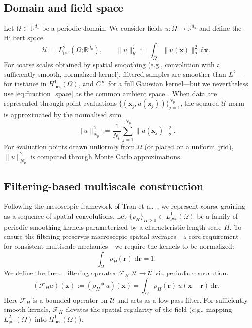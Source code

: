 \documentclass[review,onefignum,onetabnum]{siamart250211}
\newcommand{\R}{\mathbb{R}}
\newcommand{\dd}{\,\mathrm{d}}
\newcommand{\1}{\mathbf{1}}
\newcommand{\cU}{\mathcal{U}}
\newcommand{\cF}{\mathcal{F}}
\begin{document}
\subsection{Domain and field space}
Let $\Omega\subset\R^{d_x}$ be a periodic domain. We consider fields $u:\Omega\to\R^{d_u}$ and define the Hilbert space
\begin{equation}
\cU := L_{\mathrm{per}}^2(\Omega;\R^{d_u}),\qquad
\|u\|_{\cU}^2 := \int_{\Omega} \|u(\mathbf{x})\|_2^2 \dd \mathbf{x}.
\label{eq:function_space}
\end{equation}
For coarse scales obtained by spatial smoothing (e.g., convolution with a sufficiently smooth, normalized kernel), filtered samples are smoother than $L^2$---for instance in $H^1_{\mathrm{per}}(\Omega)$, and $C^\infty$ for a full Gaussian kernel---but we nevertheless use \eqref{eq:function_space} as the common ambient space~\cite{tran2016stochastic}. When data are represented through point evaluations $\{(\mathbf{x}_j,u(\mathbf{x}_j))\}_{j=1}^{N_p}$, the squared $\cU$-norm is approximated by the normalised sum
\begin{equation}
\|u\|_{N_p}^2 := \frac{1}{N_p}\sum_{j=1}^{N_p} \|u(\mathbf{x}_j)\|_2^2.
\label{eq:disc_norm}
\end{equation}
For evaluation points drawn uniformly from $\Omega$ (or placed on a uniform grid), $\|u\|_{N_p}^2$ is computed through Monte Carlo approximations.

\subsection{Filtering-based multiscale construction}
Following the mesoscopic framework of Tran et al.~\cite{tran2016stochastic}, we represent coarse-graining as a sequence of spatial convolutions. Let $\{\rho_H\}_{H>0} \subset L^1_{\mathrm{per}}(\Omega)$ be a family of periodic smoothing kernels parameterized by a characteristic length scale $H$. To ensure the filtering preserves macroscopic spatial averages—a core requirement for consistent multiscale mechanics—we require the kernels to be normalized:
\begin{equation}
\int_{\Omega}\rho_H(\mathbf{r})\,\dd \mathbf{r}=1.
\label{eq:kernel_normalization}
\end{equation}
We define the linear filtering operator $\cF_H: \cU \to \cU$ via periodic convolution:
\begin{equation}
(\cF_H u)(\mathbf{x}) := (\rho_H * u)(\mathbf{x}) = \int_{\Omega} \rho_H(\mathbf{r})\, u(\mathbf{x}-\mathbf{r}) \dd\mathbf{r}.
\label{eq:filter_operator}
\end{equation}
Here $\cF_H$ is a bounded operator on $\cU$ and acts as a low-pass filter. For sufficiently smooth kernels, $\cF_H$ elevates the spatial regularity of the field (e.g., mapping $L^2_{\mathrm{per}}(\Omega)$ into $H^1_{\mathrm{per}}(\Omega)$).
\end{document}
